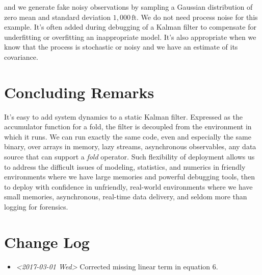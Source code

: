 \documentclass[10pt,oneside,x11names]{article}
\begin{document}
\noindent and we generate fake noisy observations by sampling a Gaussian
distribution of zero mean and standard deviation \(1,000\,\textrm{ft}\). We do not
need process noise for this example. It's often added during debugging of a
Kalman filter to compensate for underfitting or overfitting an inappropriate
model. It's also appropriate when we know that the process is stochastic or
noisy and we have an estimate of its covariance.

\section{Concluding Remarks}
\label{sec:orgaa400f7}

It's easy to add system dynamics to a static Kalman filter. Expressed as the
accumulator function for a fold, the filter is decoupled from the environment in
which it runs. We can run exactly the same code, even and especially the same
binary, over arrays in memory, lazy streams, asynchronous observables, any data
source that can support a \emph{fold} operator. Such flexibility of deployment allows
us to address the difficult issues of modeling, statistics, and numerics in
friendly environments where we have large memories and powerful debugging tools,
then to deploy with confidence in unfriendly, real-world environments where we
have small memories, asynchronous, real-time data delivery, and seldom more than
logging for forensics.



\section{Change Log}
\label{sec:orgd428bd8}
\begin{itemize}
\item \textit{<2017-03-01 Wed> } Corrected missing linear term in equation 6.
\end{itemize}
\end{document}
